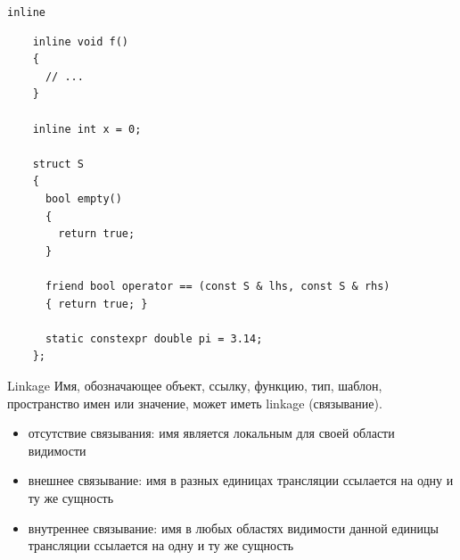 \documentclass[unknownkeysallowed,xcolor=table]{beamer}
\begin{document}
\begin{frame}[fragile]{\lstinline{inline}}
  \begin{lstlisting}
    inline void f()
    {
      // ...
    }

    inline int x = 0;

    struct S
    {
      bool empty()
      {
        return true;
      }

      friend bool operator == (const S & lhs, const S & rhs)
      { return true; }

      static constexpr double pi = 3.14;
    };
  \end{lstlisting}
\end{frame}

\begin{frame}{Linkage}
  Имя, обозначающее объект, ссылку, функцию, тип, шаблон, пространство имен или значение, может иметь linkage (связывание).

  \vspace{0.5em}

  \begin{itemize}
    \item отсутствие связывания: имя является локальным для своей области видимости  \vspace{0.5em}
    \item внешнее связывание: имя в разных единицах трансляции ссылается на одну и ту же сущность \vspace{0.5em}
    \item внутреннее связывание: имя в любых областях видимости данной единицы трансляции ссылается на одну и ту же сущность
  \end{itemize}
\end{frame}
\end{document}
